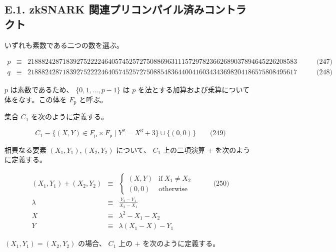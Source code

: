 \documentclass[
]{ltjsarticle}
\begin{document}
\hypertarget{e.1.-zksnark-ux95a2ux9023ux30d7ux30eaux30b3ux30f3ux30d1ux30a4ux30ebux6e08ux307fux30b3ux30f3ux30c8ux30e9ux30afux30c8}{%
\subsection{E.1. zkSNARK
関連プリコンパイル済みコントラクト}\label{e.1.-zksnark-ux95a2ux9023ux30d7ux30eaux30b3ux30f3ux30d1ux30a4ux30ebux6e08ux307fux30b3ux30f3ux30c8ux30e9ux30afux30c8}}

いずれも素数である二つの数を選ぶ。

\protect\hypertarget{eq-247}{}{}\protect\hypertarget{eq-248}{}{}

\[\begin{aligned}
p &\equiv& 21888242871839275222246405745257275088696311157297823662689037894645226208583 & \qquad \text{(247)} \\
q &\equiv& 21888242871839275222246405745257275088548364400416034343698204186575808495617 & \qquad \text{(248)}
\end{aligned}\]

\(p\) は素数であるため、 \(\{0, 1, \ldots, p - 1\}\) は \(p\)
を法とする加算および乗算について体をなす。この体を \(F_{\mathrm{p}}\)
と呼ぶ。

集合 \(C_1\) を次のように定義する。

\protect\hypertarget{eq-249}{}{}

\[C_1\equiv\{(X,Y)\in F_{\mathrm{p}}\times F_{\mathrm{p}}\mid Y^2=X^3+3\}\cup\{(0,0)\} \qquad \text{(249)}\]

相異なる要素 \((X_1, Y_1), (X_2, Y_2)\) について、 \(C_1\) 上の二項演算
\(+\) を次のように定義する。

\protect\hypertarget{eq-250}{}{}\protect\hypertarget{eq:ec-addition}{}{}

\[\begin{aligned}
(X_1, Y_1) + (X_2, Y_2)&\equiv&\begin{cases}
(X,Y)&\text{if}\ X_1\neq X_2\\
(0,0)&\text{otherwise}
\end{cases} & \qquad \text{(250)} \\
\lambda&\equiv&\frac{Y_2-Y_1}{X_2-X_1} \\
X&\equiv&\lambda^2-X_1-X_2 \\
Y&\equiv&\lambda(X_1-X)-Y_1
\end{aligned}\]

\((X_1, Y_1) = (X_2, Y_2)\) の場合、 \(C_1\) 上の \(+\)
を次のように定義する。
\end{document}
